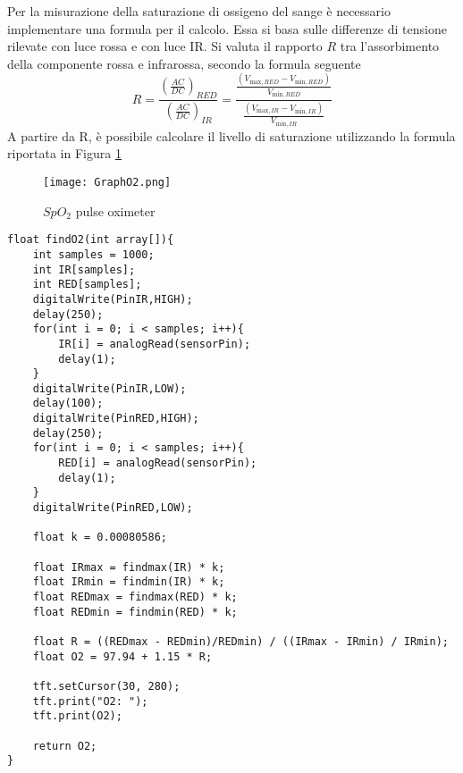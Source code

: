 Per la misurazione della saturazione di ossigeno del sange è necessario implementare una formula per il calcolo. Essa si basa sulle differenze di tensione rilevate con luce rossa e con luce IR. Si valuta il rapporto $R$ tra l’assorbimento della componente rossa e infrarossa, secondo la formula seguente
\begin{equation}
    R=\frac{\left(\frac{AC}{DC}\right)_{RED}}{\left(\frac{AC}{DC}\right)_{IR}}=\frac{\frac{\left(V_{\text{max},RED}-V_{\text{min},RED}\right)}{V_{\text{min},RED}}}{\frac{\left(V_{\text{max},IR}-V_{\text{min},IR}\right)}{V_{\text{min},IR}}}
\end{equation}
A partire da R, è possibile calcolare il livello di saturazione utilizzando la formula riportata in Figura \ref{fig:GraphO2}
\begin{figure}[H]
    \centering
    \texttt{[image: GraphO2.png]}
    \caption{$SpO_2$ pulse oximeter}
    \label{fig:GraphO2}
\end{figure}
\begin{lstlisting}[frame=single, language=Arduino]
float findO2(int array[]){
    int samples = 1000;
    int IR[samples];
    int RED[samples];
    digitalWrite(PinIR,HIGH);
    delay(250);
    for(int i = 0; i < samples; i++){
        IR[i] = analogRead(sensorPin);
        delay(1);
    }
    digitalWrite(PinIR,LOW);
    delay(100);
    digitalWrite(PinRED,HIGH);
    delay(250);
    for(int i = 0; i < samples; i++){
        RED[i] = analogRead(sensorPin);
        delay(1);
    }
    digitalWrite(PinRED,LOW);

    float k = 0.00080586;

    float IRmax = findmax(IR) * k;
    float IRmin = findmin(IR) * k;
    float REDmax = findmax(RED) * k;
    float REDmin = findmin(RED) * k; 

    float R = ((REDmax - REDmin)/REDmin) / ((IRmax - IRmin) / IRmin);
    float O2 = 97.94 + 1.15 * R;
    
    tft.setCursor(30, 280);
    tft.print("O2: ");
    tft.print(O2);
    
    return O2;
}
\end{lstlisting}
